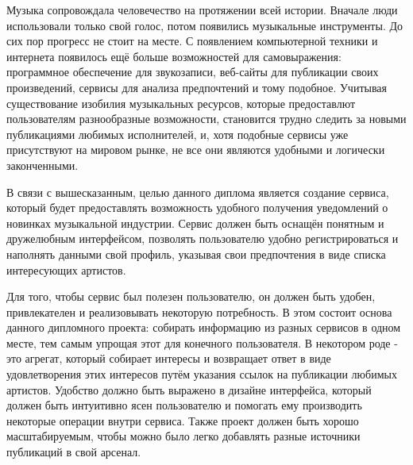 \label{sec:intro}

Музыка сопровождала человечество на протяжении всей истории. Вначале люди использовали только свой голос, потом появились музыкальные инструменты. До сих пор прогресс не стоит на месте. С появлением компьютерной техники и интернета появилось ещё больше возможностей для самовыражения: программное обеспечение для звукозаписи, веб-сайты для публикации своих произведений, сервисы для анализа предпочтений и тому подобное. Учитывая существование изобилия музыкальных ресурсов, которые предоставлют пользователям разнообразные возможности, становится трудно следить за новыми публикациями любимых исполнителей, и, хотя подобные сервисы уже присутствуют на мировом рынке, не все они являются удобными и логически законченными.

В связи с вышесказанным, целью данного диплома является создание сервиса, который будет предоставлять возможность удобного получения уведомлений о новинках музыкальной индустрии. Сервис должен быть оснащён понятным и дружелюбным интерфейсом, позволять пользователю удобно регистрироваться и наполнять данными свой профиль, указывая свои предпочтения в виде списка интересующих артистов.

Для того, чтобы сервис был полезен пользователю, он должен быть удобен, привлекателен и реализовывать некоторую потребность. В этом состоит основа данного дипломного проекта: собирать информацию из разных сервисов в одном месте, тем самым упрощая этот для конечного пользователя. В некотором роде - это агрегат, который собирает интересы и возвращает ответ в виде удовлетворения этих интересов путём указания ссылок на публикации любимых артистов. Удобство должно быть выражено в дизайне интерфейса, который должен быть интуитивно ясен пользователю и помогать ему производить некоторые операции внутри сервиса. Также проект должен быть хорошо масштабируемым, чтобы можно было легко добавлять разные источники публикаций в свой арсенал.
